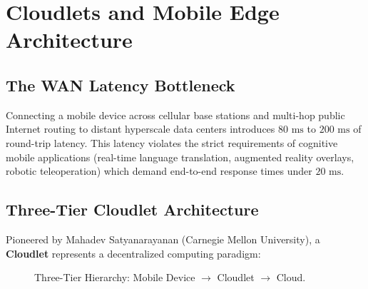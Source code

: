 \section{Cloudlets and Mobile Edge Architecture}
\subsection{The WAN Latency Bottleneck}
Connecting a mobile device across cellular base stations and multi-hop public Internet routing to distant hyperscale data centers introduces $80\text{ ms}$ to $200\text{ ms}$ of round-trip latency. This latency violates the strict requirements of cognitive mobile applications (real-time language translation, augmented reality overlays, robotic teleoperation) which demand end-to-end response times under $20\text{ ms}$.

\subsection{Three-Tier Cloudlet Architecture}
Pioneered by Mahadev Satyanarayanan (Carnegie Mellon University), a \textbf{Cloudlet} represents a decentralized computing paradigm:
\begin{figure}[H]
\centering
{}
\caption{Three-Tier Hierarchy: Mobile Device $\to$ Cloudlet $\to$ Cloud.}
\end{figure}

